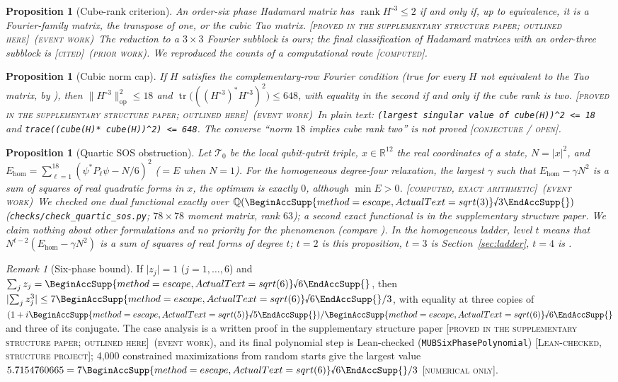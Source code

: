 \documentclass[11pt]{article}
\newcommand{\rnum}[1]{\BeginAccSupp{method=escape,ActualText=sqrt(#1)}\text{\textsurd}#1\EndAccSupp{}}
\newcommand{\rsix}{\rnum{6}}
\newcommand{\R}{\mathbb{R}}
\newcommand{\abs}[1]{\lvert #1\rvert}
\newcommand{\norm}[1]{\lVert #1\rVert}
\newcommand{\Tz}{\mathcal{T}_0}          %
\newcommand{\E}{E}                       %
\newcommand{\hcube}[1]{#1^{\circ 3}}     %
\newcommand{\st}[1]{\textsc{[#1]}}
\newcommand{\stlean}{\st{Lean-checked, structure project}}
\newcommand{\stsupp}{\st{proved in the supplementary structure paper; outlined here}}
\newcommand{\stexact}{\st{computed, exact arithmetic}}
\newcommand{\stcomp}{\st{computed}}
\newcommand{\stnum}{\st{numerical only}}
\newcommand{\stcited}{\st{cited}}
\newcommand{\stconj}{\st{conjecture / open}}
\newcommand{\event}{\textsc{(event work)}}
\newcommand{\prior}{\textsc{(prior work)}}
\newtheorem{proposition}[theorem]{Proposition}
\theoremstyle{definition}
\theoremstyle{remark}
\newtheorem{remark}[theorem]{Remark}
\begin{document}
\begin{proposition}[Cube-rank criterion]\label{prop:cuberank}
An order-six phase Hadamard matrix has $\operatorname{rank}\hcube{H}\le2$ if and only if, up to equivalence, it is
a Fourier-family matrix, the transpose of one, or the cubic Tao matrix. \stsupp\ \event\ The reduction to a
$3\times3$ Fourier subblock is ours; the final classification of Hadamard matrices with an order-three subblock is
\cite{CWT} \stcited\ \prior. We reproduced the counts of a computational route \stcomp.
\end{proposition}

\begin{proposition}[Cubic norm cap]\label{prop:cubiccap}
If $H$ satisfies the complementary-row Fourier condition (true for every $H$ not equivalent to the Tao matrix, by
\cite{CWT}), then $\norm{\hcube{H}}_{\mathrm{op}}^2\le18$ and
$\operatorname{tr}\bigl(((\hcube{H})^\ast\hcube{H})^2\bigr)\le648$, with equality in the second if and only if the cube
rank is two. \stsupp\ \event\ In plain text: \texttt{(largest singular value of cube(H))\textasciicircum2 <= 18} and
\texttt{trace((cube(H)* cube(H))\textasciicircum2) <= 648}. The converse ``norm $18$ implies cube rank
two'' is not proved \stconj.
\end{proposition}

\begin{proposition}[Quartic SOS obstruction]\label{prop:quartic}
Let $\Tz$ be the local qubit-qutrit triple, $x\in\R^{12}$ the real coordinates of a state, $N=\abs x^2$, and
$E_{\mathrm{hom}}=\sum_{\ell=1}^{18}(\psi^\ast P_\ell\psi-N/6)^2$ ($=\E$ when $N=1$).
For the \emph{homogeneous degree-four relaxation}, the largest $\gamma$ such that $E_{\mathrm{hom}}-\gamma N^2$ is a sum
of squares of real quadratic forms in $x$, the optimum is exactly $0$, although $\min\E>0$.
\stexact\ \event\ We checked one dual functional exactly over $\mathbb{Q}(\rnum{3})$
(\texttt{checks/check\_quartic\_sos.py}; $78\times78$ moment matrix, rank $63$); a second exact functional is in the
supplementary structure paper. We claim nothing about other formulations and no priority for the phenomenon (compare \cite{Sarkar26}).
In the homogeneous ladder, level $t$ means that $N^{t-2}(E_{\mathrm{hom}}-\gamma N^2)$ is a sum of squares of real forms of
degree $t$; $t=2$ is this proposition, $t=3$ is Section~\ref{sec:ladder}, $t=4$ is \cite{Erlwein}.
\end{proposition}

\begin{remark}[Six-phase bound]\label{prop:sixphase}
If $\abs{z_j}=1$ ($j=1,\dots,6$) and $\sum_jz_j=\rsix$, then $\abs{\sum_jz_j^3}\le7\rsix/3$, with equality at three
copies of $(1+i\rnum{5})/\rsix$ and three of its conjugate. The case analysis is a written proof in the supplementary structure paper \stsupp\ \event, and its final
polynomial step is Lean-checked (\texttt{MUBSixPhasePolynomial}) \stlean; 4,000 constrained maximizations from random starts give the largest value
$5.7154760665=7\rsix/3$ \stnum.
\end{remark}
\end{document}
